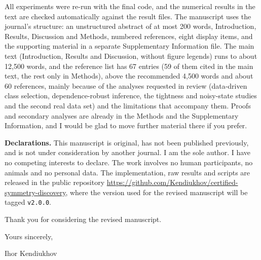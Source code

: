 \documentclass[11pt,a4paper]{article}
\begin{document}
All experiments were re-run with the final code, and the numerical results in
the text are checked automatically against the result files. The manuscript
uses the journal's structure: an unstructured abstract of at most 200 words,
Introduction, Results, Discussion and Methods, numbered references, eight
display items, and the supporting material in a separate Supplementary
Information file. The main text (Introduction, Results and Discussion, without
figure legends) runs to about 12,500 words, and the reference list has 67
entries (59 of them cited in the main text, the rest only in Methods), above
the recommended 4,500 words and about 60 references, mainly because of the
analyses requested in review (data-driven class selection, dependence-robust
inference, the tightness and noisy-state studies and the second real data set)
and the limitations that accompany them. Proofs and secondary analyses are
already in the Methods and the Supplementary Information, and I would be glad
to move further material there if you prefer.

\textbf{Declarations.} This manuscript is original, has not been published
previously, and is not under consideration by another journal. I am the sole
author. I have no competing interests to declare. The work involves no human
participants, no animals and no personal data. The implementation, raw results
and scripts are released in the public repository
\url{https://github.com/Kendiukhov/certified-symmetry-discovery}, where the
version used for the revised manuscript will be tagged \texttt{v2.0.0}.

Thank you for considering the revised manuscript.

\vspace{1em}

Yours sincerely,

\vspace{1.5em}

Ihor Kendiukhov
\end{document}

